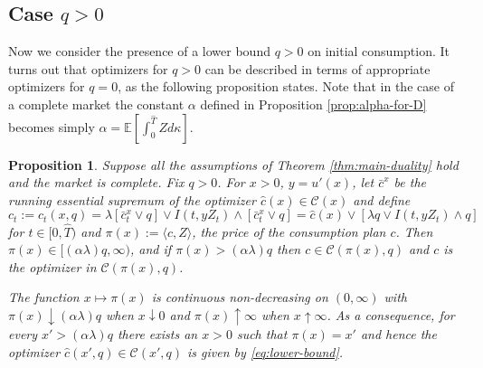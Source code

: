 \documentclass[11pt, oneside]{article}   	%
\theoremstyle{plain}
\newtheorem{prop}[thm]{Proposition}
\theoremstyle{definition}
\theoremstyle{remark}
\begin{document}


\subsection{Case $q>0$}
Now we consider the presence of a lower bound $q>0$ on initial consumption. It turns out that optimizers for $q>0$ can be described in terms of appropriate optimizers for $q=0$, as the following proposition states. Note that in the case of a complete market the constant $\alpha$ defined in Proposition \ref{prop:alpha-for-D} becomes simply $\alpha=\mathbb{E}\left[\int_0^{\hat{T}} Zd\kappa\right]$.

\begin{prop}
Suppose all the assumptions of Theorem \ref{thm:main-duality} hold and the market is complete. Fix $q>0$. For $x>0$, $y=u'(x)$, let $\bar{c}^{x}$ be the running essential supremum of the optimizer $\hat{c}(x)\in\mathcal{C}(x)$ and define
\begin{equation}\label{eq:lower-bound}
c_t:=c_t(x,q)=\lambda [\bar{c}_t^{x}\vee q]\vee I(t,yZ_t)\wedge [\bar{c}_t^{x}\vee q]=\hat{c}(x)\vee[\lambda q\vee I(t,yZ_t)\wedge q]
\end{equation}
for $t\in[0,\hat{T})$ and $\pi(x):=\langle c,Z\rangle$, the price of the consumption plan $c$. Then $\pi(x)\in[(\alpha\lambda)q,\infty)$, and if $\pi(x)>(\alpha\lambda)q$ then $c\in\mathcal{C}(\pi(x),q)$ and $c$ is the optimizer in $\mathcal{C}(\pi(x),q)$.

The function $x\mapsto \pi(x)$ is continuous non-decreasing on $(0,\infty)$ with $\pi(x)\downarrow (\alpha\lambda)q$ when $x\downarrow 0$ and $\pi(x)\uparrow \infty$ when $x\uparrow \infty$. As a consequence, for every $x'>(\alpha\lambda)q$ there exists an $x>0$ such that $\pi(x)=x'$ and hence the optimizer $\hat{c}(x',q)\in\mathcal{C}(x',q)$ is given by \eqref{eq:lower-bound}.
\end{prop}
\end{document}
